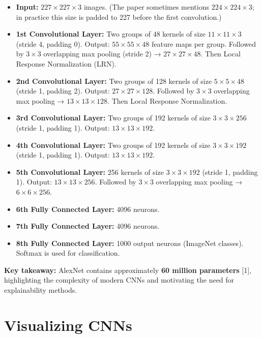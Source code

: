 \documentclass{article}
\renewcommand{\cite}[1]{[#1]}
\begin{document}
\begin{itemize}
    \item \textbf{Input:} $227\times227\times3$ images.  
    (The paper sometimes mentions $224\times224\times3$; in practice this size is padded to 227 before the first convolution.)

    \item \textbf{1st Convolutional Layer:} Two groups of 48 kernels of size $11\times11\times3$ (stride 4, padding 0).  
    Output: $55\times55\times48$ feature maps per group.  
    Followed by $3\times3$ overlapping max pooling (stride 2) → $27\times27\times48$.  
    Then Local Response Normalization (LRN).

    \item \textbf{2nd Convolutional Layer:} Two groups of 128 kernels of size $5\times5\times48$ (stride 1, padding 2).  
    Output: $27\times27\times128$.  
    Followed by $3\times3$ overlapping max pooling → $13\times13\times128$.  
    Then Local Response Normalization.

    \item \textbf{3rd Convolutional Layer:} Two groups of 192 kernels of size $3\times3\times256$ (stride 1, padding 1).  
    Output: $13\times13\times192$.

    \item \textbf{4th Convolutional Layer:} Two groups of 192 kernels of size $3\times3\times192$ (stride 1, padding 1).  
    Output: $13\times13\times192$.

    \item \textbf{5th Convolutional Layer:} 256 kernels of size $3\times3\times192$ (stride 1, padding 1).  
    Output: $13\times13\times256$.  
    Followed by $3\times3$ overlapping max pooling → $6\times6\times256$.

    \item \textbf{6th Fully Connected Layer:} 4096 neurons.
    \item \textbf{7th Fully Connected Layer:} 4096 neurons.
    \item \textbf{8th Fully Connected Layer:} 1000 output neurons (ImageNet classes).  
    Softmax is used for classification.
\end{itemize}

\textbf{Key takeaway:} AlexNet contains approximately \textbf{60 million parameters} \cite{1},
highlighting the complexity of modern CNNs and motivating the need for explainability methods.

\section{Visualizing CNNs}
\end{document}
